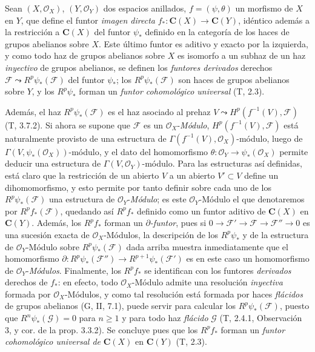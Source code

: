 \begin{env}[12.2.1]
\label{0.12.2.1-fr}
Sean $(X,\mathcal O_X)$, $(Y,\mathcal O_Y)$ dos espacios anillados,
$f=(\psi,\theta)$ un morfismo de $X$ en $Y$, que define el funtor
\emph{imagen directa}
$f_*:\boldsymbol{C}(X)\longrightarrow\boldsymbol{C}(Y)$,
idéntico además a la restricción a $\boldsymbol{C}(X)$ del funtor $\psi_*$ definido
en la categoría de los haces de grupos abelianos sobre $X$. Este último
funtor es aditivo y exacto por la izquierda, y como todo haz de grupos
abelianos sobre $X$ es isomorfo a un subhaz de un haz \emph{inyectivo} de
grupos abelianos, se definen los \emph{funtores derivados} derechos
$\mathcal F\leadsto R^p\psi_*(\mathcal F)$ del funtor $\psi_*$; los
$R^p\psi_*(\mathcal F)$ son haces de grupos abelianos sobre $Y$, y
los $R^p\psi_*$ forman un \emph{funtor cohomológico universal} (T, 2.3).

Además, el haz $R^p\psi_*(\mathcal F)$ es el haz asociado al
prehaz $V\leadsto H^p(f^{-1}(V),\mathcal F)$ (T, 3.7.2). Si ahora
se supone que $\mathcal F$ es un $\mathcal O_X$-\emph{Módulo},
$H^p(f^{-1}(V),\mathcal F)$ está naturalmente provisto de una estructura de
$\Gamma(f^{-1}(V),\mathcal O_X)$-módulo, luego de
$\Gamma(V,\psi_*(\mathcal O_X))$-módulo, y el dato del homomorfismo
$\theta:\mathcal O_Y\to\psi_*(\mathcal O_X)$ permite deducir una
estructura de $\Gamma(V,\mathcal O_Y)$-módulo. Para las estructuras así
definidas, está claro que la restricción de un abierto $V$ a un abierto
$V'\subset V$ define un dihomomorfismo, y esto permite por tanto definir sobre
cada uno de los $R^p\psi_*(\mathcal F)$ una estructura de $\mathcal O_Y$-\emph{Módulo};
es este $\mathcal O_Y$-Módulo el que denotaremos por $R^p f_*(\mathcal F)$,
quedando así $R^p f_*$ definido como un funtor aditivo de $\boldsymbol{C}(X)$ en
$\boldsymbol{C}(Y)$. Además, los $R^p f_*$ forman un \emph{$\partial$-funtor}, pues si
$0\longrightarrow\mathcal F'\longrightarrow\mathcal F
\longrightarrow\mathcal F''\longrightarrow0$
es una sucesión exacta de $\mathcal O_X$-Módulos, la descripción de los
$R^p\psi_*$ y de la estructura de $\mathcal O_Y$-Módulo sobre
$R^p\psi_*(\mathcal F)$ dada arriba muestra inmediatamente que
el homomorfismo
$\partial:R^p\psi_*(\mathcal F'')\longrightarrow
R^{p+1}\psi_*(\mathcal F')$
es en este caso un homomorfismo de $\mathcal O_Y$-\emph{Módulos}. Finalmente, los
$R^p f_*$ se identifican con los funtores \emph{derivados} derechos de $f_*$: en efecto,
todo $\mathcal O_X$-Módulo admite una resolución \emph{inyectiva} formada por
$\mathcal O_X$-Módulos, y como tal resolución está formada por haces
\emph{flácidos} de grupos abelianos (G, II, 7.1), puede servir para calcular los
$R^p\psi_*(\mathcal F)$, puesto que $R^n\psi_*(\mathcal G)=0$ para $n\geq1$ y
para todo haz \emph{flácido} $\mathcal G$ (T, 2.4.1, Observación 3, y cor. de la
prop. 3.3.2). Se concluye pues que los $R^p f_*$ forman un \emph{funtor
cohomológico universal de} $\boldsymbol{C}(X)$ en $\boldsymbol{C}(Y)$ (T, 2.3).
\end{env}

